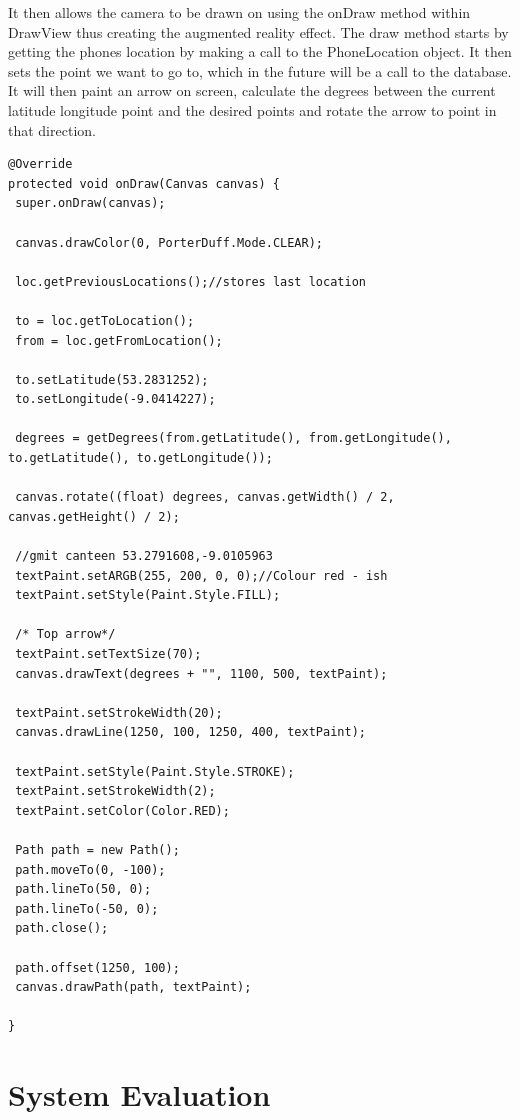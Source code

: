 It then allows the camera to be drawn on using the onDraw method within DrawView thus creating the augmented reality effect. The draw method starts by getting the phones location by making a call to the PhoneLocation object. It then sets the point we want to go to, which in the future will be a call to the database. It will then paint an arrow on screen, calculate the degrees between the current latitude longitude point and the desired points and rotate the arrow to point in that direction.
\begin{verbatim}
@Override
protected void onDraw(Canvas canvas) {
 super.onDraw(canvas);

 canvas.drawColor(0, PorterDuff.Mode.CLEAR);

 loc.getPreviousLocations();//stores last location

 to = loc.getToLocation();
 from = loc.getFromLocation();

 to.setLatitude(53.2831252);
 to.setLongitude(-9.0414227);

 degrees = getDegrees(from.getLatitude(), from.getLongitude(), to.getLatitude(), to.getLongitude());

 canvas.rotate((float) degrees, canvas.getWidth() / 2, canvas.getHeight() / 2);

 //gmit canteen 53.2791608,-9.0105963
 textPaint.setARGB(255, 200, 0, 0);//Colour red - ish
 textPaint.setStyle(Paint.Style.FILL);

 /* Top arrow*/
 textPaint.setTextSize(70);
 canvas.drawText(degrees + "", 1100, 500, textPaint);

 textPaint.setStrokeWidth(20);
 canvas.drawLine(1250, 100, 1250, 400, textPaint);

 textPaint.setStyle(Paint.Style.STROKE);
 textPaint.setStrokeWidth(2);
 textPaint.setColor(Color.RED);

 Path path = new Path();
 path.moveTo(0, -100);
 path.lineTo(50, 0);
 path.lineTo(-50, 0);
 path.close();

 path.offset(1250, 100);
 canvas.drawPath(path, textPaint);
 
}
\end{verbatim}

\chapter{System Evaluation}
